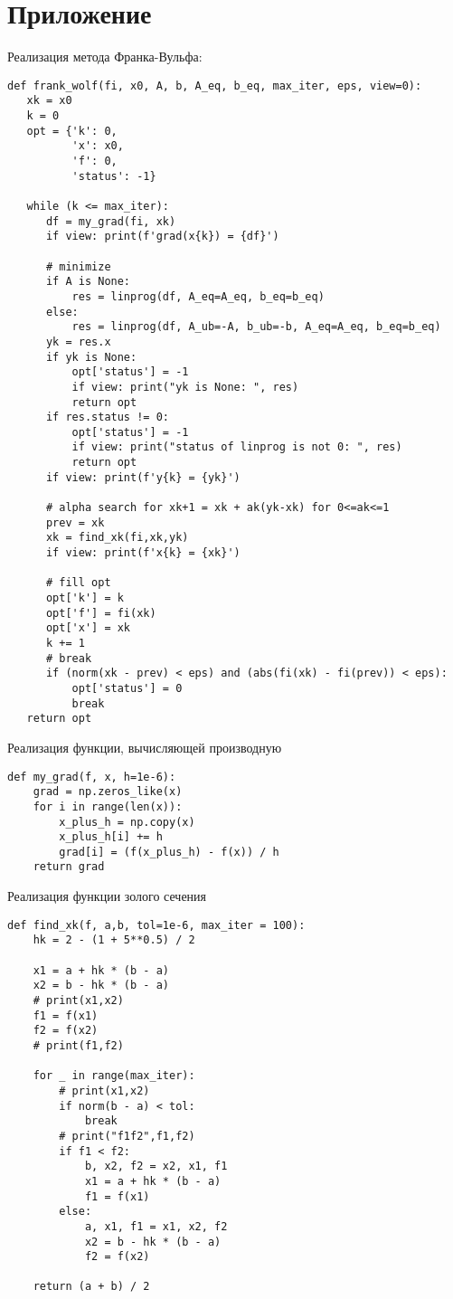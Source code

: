 \documentclass{article}
\begin{document}
\newpage
\section*{Приложение}
%
Реализация метода Франка-Вульфа:
\begin{lstlisting}
def frank_wolf(fi, x0, A, b, A_eq, b_eq, max_iter, eps, view=0):
   xk = x0
   k = 0
   opt = {'k': 0,
          'x': x0,
          'f': 0,
          'status': -1}

   while (k <= max_iter):
      df = my_grad(fi, xk)
      if view: print(f'grad(x{k}) = {df}')

      # minimize
      if A is None:
          res = linprog(df, A_eq=A_eq, b_eq=b_eq)
      else:
          res = linprog(df, A_ub=-A, b_ub=-b, A_eq=A_eq, b_eq=b_eq)
      yk = res.x
      if yk is None:
          opt['status'] = -1
          if view: print("yk is None: ", res)
          return opt
      if res.status != 0:
          opt['status'] = -1
          if view: print("status of linprog is not 0: ", res)
          return opt
      if view: print(f'y{k} = {yk}')

      # alpha search for xk+1 = xk + ak(yk-xk) for 0<=ak<=1
      prev = xk
      xk = find_xk(fi,xk,yk)
      if view: print(f'x{k} = {xk}')

      # fill opt
      opt['k'] = k
      opt['f'] = fi(xk)
      opt['x'] = xk
      k += 1
      # break
      if (norm(xk - prev) < eps) and (abs(fi(xk) - fi(prev)) < eps):
          opt['status'] = 0
          break
   return opt
\end{lstlisting}






\newpage
Реализация функции, вычисляющей производную
\begin{lstlisting}
def my_grad(f, x, h=1e-6):
    grad = np.zeros_like(x)
    for i in range(len(x)):
    	x_plus_h = np.copy(x)
    	x_plus_h[i] += h
    	grad[i] = (f(x_plus_h) - f(x)) / h
    return grad
\end{lstlisting}


Реализация функции золого сечения


\begin{lstlisting}
def find_xk(f, a,b, tol=1e-6, max_iter = 100):
    hk = 2 - (1 + 5**0.5) / 2

    x1 = a + hk * (b - a)
    x2 = b - hk * (b - a)
    # print(x1,x2)
    f1 = f(x1)
    f2 = f(x2)
    # print(f1,f2)

    for _ in range(max_iter):
        # print(x1,x2)
        if norm(b - a) < tol:
            break
        # print("f1f2",f1,f2)
        if f1 < f2:
            b, x2, f2 = x2, x1, f1
            x1 = a + hk * (b - a)
            f1 = f(x1)
        else:
            a, x1, f1 = x1, x2, f2
            x2 = b - hk * (b - a)
            f2 = f(x2)

    return (a + b) / 2
\end{lstlisting}
\end{document}
